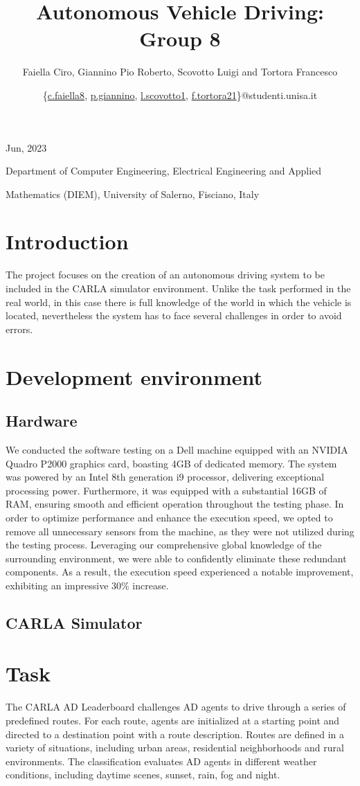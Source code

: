 \documentclass{article}
\title{\textbf{\myfont Autonomous Vehicle Driving: Group 8}}
\author{\small{Faiella Ciro, Giannino Pio Roberto, Scovotto Luigi and Tortora Francesco}}
\date{\small{\{\href{mailto:c.faiella8@studenti.unisa.it}{c.faiella8}, \href{mailto:p.giannino@studenti.unisa.it}{p.giannino}, \href{mailto:l.scovotto1@studenti.unisa.it}{l.scovotto1}, \href{mailto:f.tortora21@studenti.unisa.it}{f.tortora21}\}@studenti.unisa.it}}
\begin{document}
\maketitle
\centerline{\small{Jun, 2023}}
\centerline{Department of Computer Engineering, Electrical Engineering and Applied}
\centerline{Mathematics (DIEM), University of Salerno, Fisciano, Italy}


\section{Introduction}
The project focuses on the creation of an autonomous driving system to be included in the CARLA simulator 
environment. Unlike the task performed in the real world, in this case there is full knowledge of the world 
in which the vehicle is located, nevertheless the system has to face several challenges in order to avoid 
errors. 

\section{Development environment}
\subsection{Hardware}
We conducted the software testing on a Dell machine equipped with an NVIDIA Quadro P2000 graphics card, boasting 4GB of dedicated memory. 
The system was powered by an Intel 8th generation i9 processor, delivering exceptional processing power. Furthermore, it was equipped with a 
substantial 16GB of RAM, ensuring smooth and efficient operation throughout the testing phase.
In order to optimize performance and enhance the execution speed, we opted to remove all unnecessary sensors from the machine, 
as they were not utilized during the testing process. Leveraging our comprehensive global knowledge of the surrounding environment, 
we were able to confidently eliminate these redundant components. As a result, the execution speed experienced a notable improvement, exhibiting an impressive 30\% increase.

\subsection{CARLA Simulator}

\section{Task}
The CARLA AD Leaderboard challenges AD agents to drive through a series of predefined routes. For each route, 
agents are initialized at a starting point and directed to a destination point with a route description. 
Routes are defined in a variety of situations, including urban areas, residential neighborhoods and rural environments. 
The classification evaluates AD agents in different weather conditions, including daytime scenes, sunset, rain, fog and night.
\end{document}
